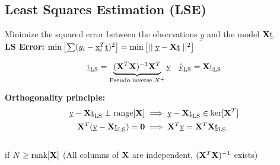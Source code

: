 \begin{mdframed}[style=eqbox]
  \subsection{Least Squares Estimation (LSE)}
  Minimize the squared error between the observations $\underbar{y}$ and the model $\mathbf{X} \underbar{t}$.\\[0.25em]
  \textbf{LS Error:} $\min \left[\sum (y_i - \underbar{x}_i^T \underbar{t})^2\right] = \min \left[\mid\mid \underbar{y} - \mathbf{X} \underbar{t} \mid\mid^2\right]$
  \begin{mdframed}[style=redbox]
    \vspace*{-10pt}
    \begin{align*}
      \underbar{t}_{\text{LS}} = \underbrace{(\mathbf{X}^T \mathbf{X})^{-1} \mathbf{X}^T}_{\text{Pseudo inverse~} X^+} \underbar{y} && \hat{\underbar{y}}_{\text{LS}} = \mathbf{X} \underbar{t}_{\text{LS}}
    \end{align*}
  \end{mdframed}
  \textbf{Orthogonality principle:}
  \vspace*{-4pt}
  \begin{align*}
    \underbar{y} - \mathbf{X}\underbar{t}_{\text{LS}} \perp \text{range}[\mathbf{X}] &\implies \underbar{y} - \mathbf{X}\underbar{t}_{\text{LS}} \in \text{ker}[\mathbf{X}^T]\\
    \mathbf{X}^T(\underbar{y} - \mathbf{X}\underbar{t}_{\text{LS}}) = \mathbf{0} &\implies \mathbf{X}^T \underbar{y} = \mathbf{X}^T \mathbf{X} \underbar{t}_{\text{LS}}\\
  \end{align*}\vspace*{-24pt}\\
  \small{if $N \geq \text{rank}[\mathbf{X}]$ (All columns of $\mathbf{X}$ are independent, $(\mathbf{X}^T \mathbf{X})^{-1}$ exists)}
\end{mdframed}
